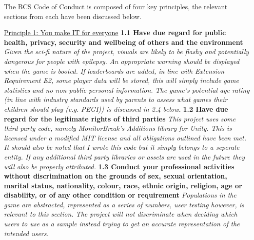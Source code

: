 \documentclass{report}
\begin{document}
The BCS Code of Conduct \cite{bcs} is composed of four key principles, the relevant sections from each have been discussed below.
\newline
\newline
\begin{raggedright}
{\Large \underline{Principle 1: You make IT for everyone}}
\newline
\newline
\textbf{1.1 Have due regard for public health, privacy, security and wellbeing of others and the environment}
\newline
\newline
\textit{Given the sci-fi nature of the project, visuals are likely to be flashy and potentially dangerous for people with epilepsy. An appropriate warning should be displayed when the game is booted. If leaderboards are added, in line with Extension Requirement E2, some player data will be stored, this will simply include game statistics and no non-public personal information. The game's potential age rating (in line with industry standards used by parents to assess what games their children should play (e.g. PEGI)) is discussed in 2.4 below.}
\newline
\newline
\textbf{1.2 Have due regard for the legitimate rights of third parties}
\newline
\newline
\textit{This project uses some third party code, namely MonitorBreak's Additions library for Unity. This is licensed under a modified MIT license\cite{additionsLicense} and all obligations outlined have been met. It should also be noted that I wrote this code but it simply belongs to a seperate entity.
If any additional third party libraries or assets are used in the future they will also be properly attributed.}
\newline
\newline
\textbf{1.3 Conduct your professional activities without discrimination on the grounds of sex, sexual orientation, marital status, nationality, colour, race, ethnic origin, religion, age or disability, or of any other condition or requirement}
\newline
\newline
\textit{Populations in the game are abstracted, represented as a series of numbers, user testing however, is relevant to this section. The project will not discriminate when deciding which users to use as a sample instead trying to get an accurate representation of the intended users.}

\end{raggedright}
\end{document}
